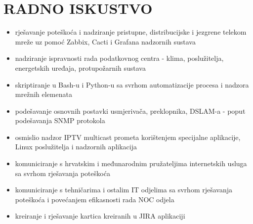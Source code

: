 \documentclass{cv}
\begin{document}
\section{RADNO ISKUSTVO}
\begin{itemize}
    \setlength\itemsep{0.1cm}
    \item rješavanje poteškoća i nadziranje pristupne, distribucijske i jezgrene telekom mreže uz pomoć Zabbix, Cacti i Grafana nadzornih sustava
    \item nadziranje ispravnosti rada podatkovnog centra - klima, poslužitelja, energetskih uređaja, protupožarnih sustava
    \item skriptiranje u Bash-u i Python-u sa svrhom automatizacije procesa i nadzora mrežnih elemenata
    \item podešavanje osnovnih postavki usmjerivača, preklopnika, DSLAM-a - poput podešavanja SNMP protokola
    \item osmislio nadzor IPTV multicast prometa korištenjem specijalne aplikacije, Linux poslužitelja i nadzornih aplikacija
    \item komuniciranje s hrvatskim i međunarodnim pružateljima internetskih usluga sa svrhom rješavanja poteškoća
    \item komuniciranje s tehničarima i ostalim IT odjelima sa svrhom rješavanja poteškoća i povećanjem efikasnosti rada NOC odjela
    \item kreiranje i rješavanje kartica kreiranih u JIRA aplikaciji
\end{itemize}
\end{document}
